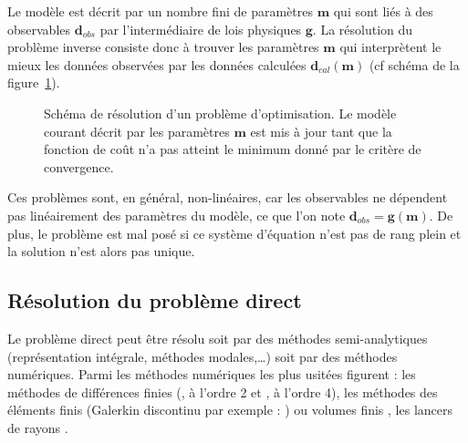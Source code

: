 Le modèle est décrit par un nombre fini de paramètres $\bm{m}$ qui sont liés à des observables $\bm{d}_{obs}$ par l'intermédiaire de lois physiques $\bm{g}$. La résolution du problème inverse consiste donc à trouver les paramètres $\bm{m}$ qui interprètent le mieux les données observées par les données calculées $\bm{d}_{cal}(\bm{m})$ (cf schéma de la figure~\ref{pb_inv}). 

\begin{figure}[!h]
	\centering
	\caption{\label{pb_inv} Schéma de résolution d'un problème d'optimisation. Le modèle courant décrit par les paramètres $\bm{m}$ est mis à jour tant que la fonction de coût n'a pas atteint le minimum donné par le critère de convergence.}
\end{figure}

Ces problèmes sont, en général, non-linéaires, car les observables ne dépendent pas linéairement des paramètres du modèle, ce que l'on note $\bm{d}_{obs}=\bm{g}(\bm{m})$. De plus, le problème est mal posé si ce système d'équation n'est pas de rang plein et la solution n'est alors pas unique.

\subsection{Résolution du problème direct}

Le problème direct peut être résolu soit par des méthodes semi-analytiques (représentation intégrale, méthodes modales,\ldots) soit par des méthodes numériques. Parmi les méthodes numériques les plus usitées figurent : les méthodes de différences finies (\citealp{virieux_86}, à l'ordre 2 et \citealp{levander}, à l'ordre 4), les méthodes des éléments finis (Galerkin discontinu par exemple : \citealp{brossier_these}) ou volumes finis \citep{brossier_2008}, les lancers de rayons \citep{virieux_ray}. 

